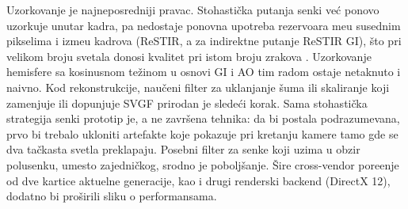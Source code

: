 Uzorkovanje je najneposredniji pravac. Stohasti\v{c}ka putanja senki ve\'c ponovo uzorkuje unutar
kadra, pa nedostaje ponovna upotreba rezervoara me\dj u susednim pikselima i izme\dj u kadrova
(ReSTIR, a za indirektne putanje ReSTIR GI), \v{s}to pri velikom broju svetala donosi kvalitet pri
istom broju zrakova \cite{bitterli2020restir, ouyang2021restirgi}. Uzorkovanje hemisfere sa
kosinusnom te\v{z}inom u osnovi GI i AO tim radom ostaje netaknuto i naivno. Kod rekonstrukcije,
nau\v{c}eni filter za uklanjanje \v{s}uma ili skaliranje koji zamenjuje ili dopunjuje SVGF prirodan
je slede\'ci korak. Sama stohasti\v{c}ka strategija senki prototip je, a ne zavr\v{s}ena tehnika:
da bi postala podrazumevana, prvo bi trebalo ukloniti artefakte koje pokazuje pri kretanju kamere
tamo gde se dva ta\v{c}kasta svetla preklapaju. Posebni filter za senke koji uzima u obzir
polusenku, umesto zajedni\v{c}kog, srodno je pobolj\v{s}anje. \v{S}ire cross-vendor pore\dj enje
od dve kartice aktuelne generacije, kao i drugi renderski backend (DirectX 12), dodatno bi
pro\v{s}irili sliku o performansama.
